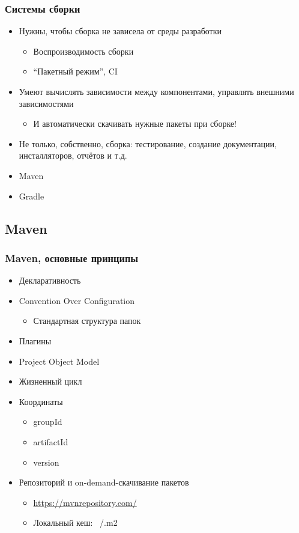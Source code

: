\documentclass[xetex,mathserif,serif]{beamer}
\begin{document}
	\begin{frame}
		\frametitle{Системы сборки}
		\begin{itemize}
			\item Нужны, чтобы сборка не зависела от среды разработки
			\begin{itemize}
				\item Воспроизводимость сборки
				\item ``Пакетный режим'', CI
			\end{itemize}
			\item Умеют вычислять зависимости между компонентами, управлять внешними зависимостями
			\begin{itemize}
				\item И автоматически скачивать нужные пакеты при сборке!
			\end{itemize}
			\item Не только, собственно, сборка: тестирование, создание документации, инсталляторов, отчётов и т.д.
			\item Maven
			\item Gradle
		\end{itemize}
	\end{frame}

	\subsection{Maven}

	\begin{frame}
		\frametitle{Maven, основные принципы}
		\begin{itemize}
			\item Декларативность
			\item Convention Over Configuration
			\begin{itemize}
				\item Стандартная структура папок
			\end{itemize}
			\item Плагины
			\item Project Object Model
			\item Жизненный цикл
			\item Координаты
			\begin{itemize}
				\item groupId
				\item artifactId
				\item version
			\end{itemize}
			\item Репозиторий и on-demand-скачивание пакетов
			\begin{itemize}
				\item \url{https://mvnrepository.com/}
				\item Локальный кеш: ~/.m2
			\end{itemize}
		\end{itemize}
	\end{frame}
\end{document}
